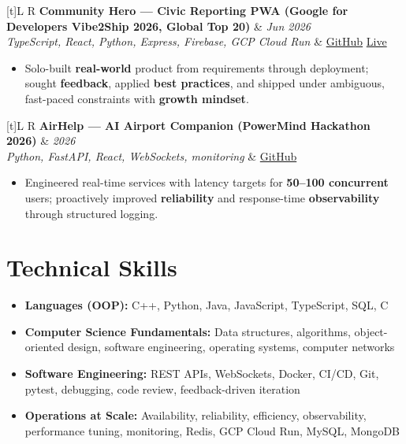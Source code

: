 \documentclass[a4paper,10pt]{article}
\newcommand{\resumeProject}[4]{%
  \vspace{0.5mm}
  \noindent
  \begin{tabularx}{\textwidth}[t]{L R}
    \textbf{#1} & \textit{#3} \\
    \textit{#2} & #4 \\
  \end{tabularx}
  \vspace{-0.5mm}%
}
\begin{document}
\resumeProject
  {Community Hero --- Civic Reporting PWA (Google for Developers Vibe2Ship 2026, Global Top 20)}
  {TypeScript, React, Python, Express, Firebase, GCP Cloud Run}
  {Jun 2026}
  {\href{https://github.com/Ojas-Srivastava05/community-hero}{GitHub} \textbar{} \href{https://community-hero-987477089222.asia-south1.run.app}{Live}}
\begin{itemize}
  \item Solo-built \textbf{real-world} product from requirements through deployment; sought \textbf{feedback}, applied \textbf{best practices}, and shipped under ambiguous, fast-paced constraints with \textbf{growth mindset}.
\end{itemize}

\resumeProject
  {AirHelp --- AI Airport Companion (PowerMind Hackathon 2026)}
  {Python, FastAPI, React, WebSockets, monitoring}
  {2026}
  {\href{https://github.com/Ojas-Srivastava05/AirHelp-AI-Airport-Assistant}{GitHub}}
\begin{itemize}
  \item Engineered real-time services with latency targets for \textbf{50--100 concurrent} users; proactively improved \textbf{reliability} and response-time \textbf{observability} through structured logging.
\end{itemize}

\section{Technical Skills}
\small
\begin{itemize}[label={}]
  \item \textbf{Languages (OOP):} C++, Python, Java, JavaScript, TypeScript, SQL, C
  \item \textbf{Computer Science Fundamentals:} Data structures, algorithms, object-oriented design, software engineering, operating systems, computer networks
  \item \textbf{Software Engineering:} REST APIs, WebSockets, Docker, CI/CD, Git, pytest, debugging, code review, feedback-driven iteration
  \item \textbf{Operations at Scale:} Availability, reliability, efficiency, observability, performance tuning, monitoring, Redis, GCP Cloud Run, MySQL, MongoDB
\end{itemize}
\end{document}
